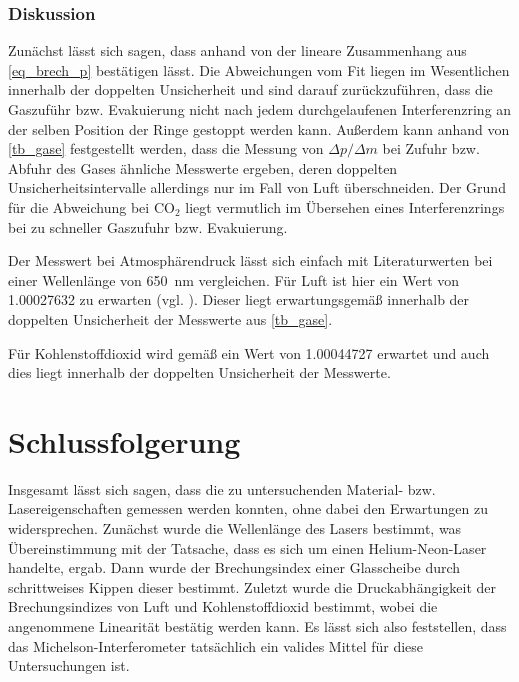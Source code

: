 \documentclass[
	a4paper,
	12pt,
	pagesize,
	ngerman
]{scrartcl}
\begin{document}
	\subsubsection{Diskussion}
	Zunächst lässt sich sagen, dass anhand von  der lineare Zusammenhang aus \cref{eq_brech_p} bestätigen lässt.
	Die Abweichungen vom Fit liegen im Wesentlichen innerhalb der doppelten Unsicherheit und sind darauf zurückzuführen, dass die Gaszuführ bzw. Evakuierung nicht nach jedem durchgelaufenen Interferenzring an der selben Position der Ringe gestoppt werden kann.
	Außerdem kann anhand von \cref{tb_gase} festgestellt werden, dass die Messung von $\Delta p/\Delta m$ bei Zufuhr bzw. Abfuhr des Gases ähnliche Messwerte ergeben, deren doppelten Unsicherheitsintervalle allerdings nur im Fall von Luft überschneiden.
	Der Grund für die Abweichung bei CO$_2$ liegt vermutlich im Übersehen eines Interferenzrings bei zu schneller Gaszufuhr bzw. Evakuierung.

	Der Messwert bei Atmosphärendruck lässt sich einfach mit Literaturwerten bei einer Wellenlänge von \SI{650}{nm} vergleichen.
	Für Luft ist hier ein Wert von \SI{1.00027632}{} zu erwarten (vgl. \cite{Brechungsindizes}).
	Dieser liegt erwartungsgemäß innerhalb der doppelten Unsicherheit der Messwerte aus \cref{tb_gase}.

	Für Kohlenstoffdioxid wird gemäß \cite{GlasFormula} ein Wert von \SI{1.00044727}{} erwartet und auch dies liegt innerhalb der doppelten Unsicherheit der Messwerte.

	\section{Schlussfolgerung}
	Insgesamt lässt sich sagen, dass die zu untersuchenden Material- bzw. Lasereigenschaften gemessen werden konnten, ohne dabei den Erwartungen zu widersprechen.
	Zunächst wurde die Wellenlänge des Lasers bestimmt, was Übereinstimmung mit der Tatsache, dass es sich um einen Helium-Neon-Laser handelte, ergab.
	Dann wurde der Brechungsindex einer Glasscheibe durch schrittweises Kippen dieser bestimmt.
	Zuletzt wurde die Druckabhängigkeit der Brechungsindizes von Luft und Kohlenstoffdioxid bestimmt, wobei die angenommene Linearität bestätig werden kann.
	Es lässt sich also feststellen, dass das Michelson-Interferometer tatsächlich ein valides Mittel für diese Untersuchungen ist. %

	\printbibliography
\end{document}
